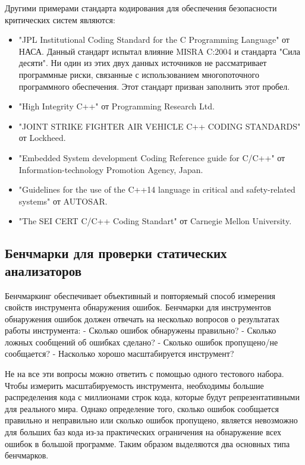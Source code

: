 Другими примерами стандарта кодирования для обеспечения безопасности критических систем являются:
\begin{itemize}
    \item "JPL Institutional Coding Standard for the C Programming Language"\autocite{JPL} от НАСА. Данный стандарт испытал влияние MISRA C:2004 и 
        стандарта "Сила десяти"\autocite{powerOfTen}. Ни один из этих двух данных источников не рассматривает программные риски, связанные с использованием 
        многопоточного программного обеспечения. Этот стандарт призван заполнить этот пробел.
    \item "High Integrity C++"\autocite{highIntegrity} от Programming Research Ltd. 
    \item "JOINT STRIKE FIGHTER AIR VEHICLE C++ CODING STANDARDS"\autocite{JSF} от Lockheed.
    \item "Embedded System development Coding Reference guide for C/C++"\autocite{escrC, escrCPP} от Information-technology Promotion Agency, Japan.
    \item "Guidelines for the use of the C++14 language in critical and safety-related systems"\autocite{autosar} от AUTOSAR.
    \item "The SEI CERT C/C++ Coding Standart" от Carnegie Mellon University\autocite{CERT}. 
\end{itemize}

\subsection{Бенчмарки для проверки статических анализаторов}
Бенчмаркинг обеспечивает объективный и повторяемый способ измерения свойств инструмента обнаружения ошибок. Бенчмарки для инструментов обнаружения 
ошибок должен отвечать на несколько вопросов о результатах работы инструмента\autocite{}: 
- Сколько ошибок обнаружены правильно?
- Сколько ложных сообщений об ошибках сделано?
- Сколько ошибок пропущено/не сообщается?
- Насколько хорошо масштабируется инструмент?

Не на все эти вопросы можно ответить с помощью одного тестового набора. Чтобы измерить масштабируемость инструмента, необходимы большие распределения 
кода с миллионами строк кода, которые будут репрезентативными для реального мира. Однако определение того, сколько ошибок сообщается правильно и 
неправильно или сколько ошибок пропущено, является невозможно для больших баз кода из-за практических ограничения на обнаружение всех ошибок в большой 
программе. Таким образом выделяются два основных типа бенчмарков. 

